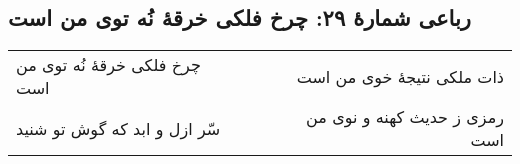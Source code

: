 \begin{center}
\section*{رباعی شمارهٔ ۲۹: چرخ فلکی خرقۀ نُه توی من است}
\label{sec:029}
\begin{longtable}{l p{0.5cm} r}
چرخ فلکی خرقهٔ نُه توی من است
&&
ذات ملکی نتیجهٔ خوی من است
\\
سّر ازل و ابد که گوش تو شنید
&&
رمزی ز حدیث کهنه و نوی من است
\\
\end{longtable}
\end{center}
